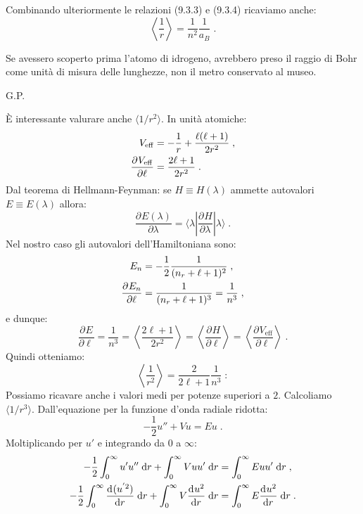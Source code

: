 \documentclass[10pt,a4paper]{report}
\theoremstyle{definition}
\newcommand{\pdev}[3][]{\frac{\partial^{#1} #2}{\partial #3^{#1}}}
\newcommand{\dev}[3][]{\frac{\mathrm{d}^{#1} #2}{\mathrm{d} #3^{#1}}}
\numberwithin{equation}{section}
\newcommand{\diff}[1][]{\mathrm{d}#1}
\newcommand{\bra}{\langle}
\newcommand{\ket}{\rangle}
\begin{document}
Combinando ulteriormente le relazioni (9.3.3) e (9.3.4) ricaviamo anche:
\begin{equation}
\left\langle \frac{1}{r}\right\rangle =\frac{1}{n^2}\frac{1}{a_B}\;.
\end{equation}
\begin{quoting}
Se avessero scoperto prima l'atomo di idrogeno, avrebbero preso il raggio di Bohr come unità di misura delle lunghezze, non il metro conservato al museo.
\begin{flushright}
G.P.
\end{flushright}
\end{quoting}
È interessante valurare anche $\bra 1/r^2 \ket$. In unità atomiche:
\begin{align}
V_{\mathrm{eff}}&=-\frac{1}{r}+\frac{\ell(\ell+1)}{2r^2} \notag\;, \\
\pdev{V_{\mathrm{eff}}}{\ell} &= \frac{2\ell+1}{2r^2}\;.
\end{align}
Dal teorema di Hellmann-Feynman: se $H\equiv H(\lambda)$ ammette autovalori $E\equiv E(\lambda)$ allora:
\begin{equation}
\pdev{E(\lambda)}{\lambda}=\bra \lambda|\pdev{H}{\lambda}|\lambda \ket\;.
\end{equation}
Nel nostro caso gli autovalori dell'Hamiltoniana sono:
\begin{align}
E_n &=-\frac{1}{2}\frac{1}{(n_r+\ell+1)^2} \notag\;, \\
\pdev{E_n}{\ell}&=\frac{1}{(n_r+\ell+1)^3}=\frac{1}{n^3}\;,
\end{align}
e dunque:
\begin{equation}
\pdev{E}{\ell}=\frac{1}{n^3}=\left\langle \frac{2\ell+1}{2r^2}\right\rangle =\left\langle \pdev{H}{\ell}\right\rangle=\left\langle \pdev{V_{\mathrm{eff}}}{\ell} \right\rangle\;.
\end{equation}
Quindi otteniamo:
\begin{equation}
\left\langle \frac{1}{r^2} \right\rangle= \frac{2}{2\ell+1}\frac{1}{n^3}\;:
\end{equation}
Possiamo ricavare anche i valori medi per potenze superiori a $2$. Calcoliamo $\bra 1/r^3\ket$. Dall'equazione per la funzione d'onda radiale ridotta:
\begin{equation}
-\frac{1}{2}u''+Vu=Eu\;.
\end{equation}
Moltiplicando per $u'$ e integrando da $0$ a $\infty$:
\begin{align}
-\frac{1}{2}\int_0^{\infty} u'u''\;\diff{r}+\int_0^{\infty} Vuu'\;\diff{r} &= \int_0^{\infty} Euu'\;\diff{r}\;, \notag \\
-\frac{1}{2}\int_0^{\infty}\dev{(u^{'2})}{r}\;\diff{r}+\int_0^{\infty} V\dev{u^2}{r}\;\diff{r} &= \int_0^{\infty} E \dev{u^2}{r}\;\diff{r}\;.
\end{align}
\end{document}
